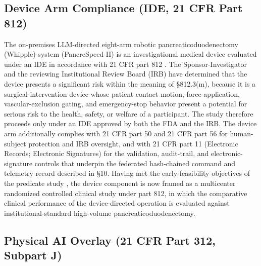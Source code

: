 \subsection{Device Arm Compliance (IDE, 21 CFR Part 812)}

The on-premises LLM-directed eight-arm robotic pancreaticoduodenectomy (Whipple)
system (PancreSpeed II) is an investigational medical device evaluated under an
IDE in accordance with 21 CFR part 812 \cite{ecfr2026part812}. The
Sponsor-Investigator and the reviewing Institutional Review Board (IRB) have
determined that the device presents a significant risk within the meaning of
\S812.3(m), because it is a surgical-intervention device whose patient-contact
motion, force application, vascular-exclusion gating, and emergency-stop behavior
present a potential for serious risk to the health, safety, or welfare of a
participant. The study therefore proceeds only under an IDE approved by both the
FDA and the IRB. The device arm additionally complies with 21 CFR part 50
\cite{ecfr2026part50} and 21 CFR part 56 for human-subject protection and IRB
oversight, and with 21 CFR part 11 (Electronic Records; Electronic Signatures)
\cite{ecfr2026part11} for the validation, audit-trail, and electronic-signature
controls that underpin the federated hash-chained command and telemetry record
described in \S10. Having met the early-feasibility objectives of the predicate
study \cite{kawchak2026phase1}, the device component is now framed as a
multicenter randomized controlled clinical study under part 812, in which the
comparative clinical performance of the device-directed operation is evaluated
against institutional-standard high-volume pancreaticoduodenectomy.

\clearpage

\subsection{Physical AI Overlay (21 CFR Part 312, Subpart J)}

